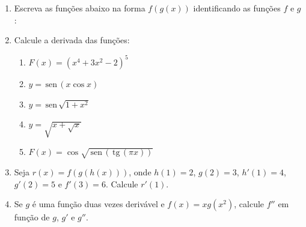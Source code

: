 \documentclass[a4paper,5pt]{amsbook}
\newcommand{\sen}{\,\mbox{sen}\,}
\newcommand{\tg}{\,\mbox{tg}\,}
\begin{document}
\vspace{1cm}
\begin{enumerate}
    \vspace{0.5cm}
    \item Escreva as fun\c{c}\~oes abaixo na forma $f(g(x))$ identificando as fun\c{c}\~oes
        $f$ e $g$:


    \vspace{0.5cm}
    \item Calcule a derivada das fun\c{c}\~oes:
        \begin{enumerate}
            \vspace{0.3cm}
            \item $F(x)={(x^4+3x^2-2)}^5$
            \vspace{0.3cm}
            \item $y=\sen{(x \cos{x})}$
            \vspace{0.3cm}
            \item $y=\sen\sqrt{1+x^2}$
            \vspace{0.3cm}
            \item $y=\sqrt{x+\sqrt{x}}$
            \vspace{0.3cm}
            \item $F(x)=\cos\sqrt{\sen{(\tg{(\pi x)})}}$
        \end{enumerate}

    \vspace{0.5cm}
    \item Seja $r(x)=f(g(h(x)))$, onde $h(1)=2$, $g(2)=3$, $h'(1)=4$, $g'(2)=5$
        e $f'(3)=6$. Calcule $r'(1)$.

    \vspace{0.5cm}
    \item Se $g$ \'e uma fun\c{c}\~ao duas vezes deriv\'avel e $f(x)=xg(x^2)$, calcule
        $f''$ em fun\c{c}\~ao de $g$, $g'$ e $g''$.


\end{enumerate}
\end{document}
